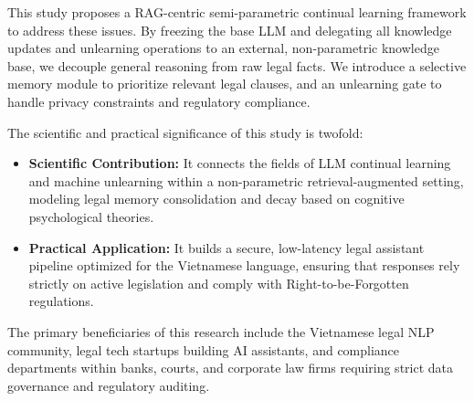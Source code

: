This study proposes a RAG-centric semi-parametric continual learning framework to address these issues. By freezing the base LLM and delegating all knowledge updates and unlearning operations to an external, non-parametric knowledge base, we decouple general reasoning from raw legal facts. We introduce a selective memory module to prioritize relevant legal clauses, and an unlearning gate to handle privacy constraints and regulatory compliance.

The scientific and practical significance of this study is twofold:
\begin{itemize}
    \item \textbf{Scientific Contribution:} It connects the fields of LLM continual learning and machine unlearning within a non-parametric retrieval-augmented setting, modeling legal memory consolidation and decay based on cognitive psychological theories.
    \item \textbf{Practical Application:} It builds a secure, low-latency legal assistant pipeline optimized for the Vietnamese language, ensuring that responses rely strictly on active legislation and comply with Right-to-be-Forgotten regulations.
\end{itemize}

The primary beneficiaries of this research include the Vietnamese legal NLP community, legal tech startups building AI assistants, and compliance departments within banks, courts, and corporate law firms requiring strict data governance and regulatory auditing.